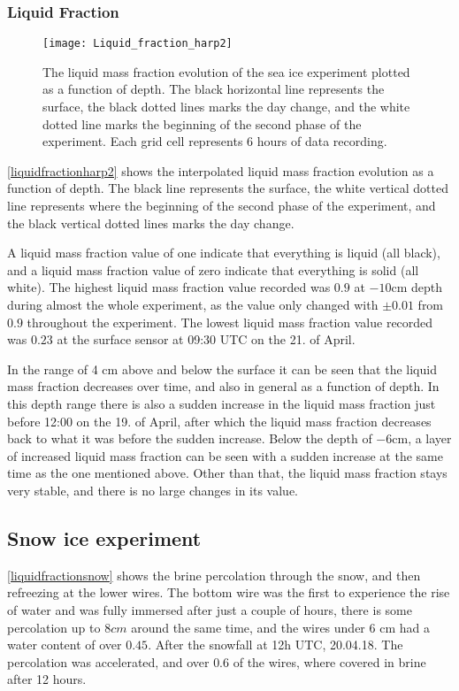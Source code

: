 \subsubsection{Liquid Fraction}
\begin{figure}[h!]
	\centering
	\texttt{[image: Liquid\_fraction\_harp2]}
	\caption{The liquid mass fraction evolution of the sea ice experiment plotted as a function of depth. The black horizontal line represents the surface, the black dotted lines marks the day change, and the white dotted line marks the beginning of the second phase of the experiment. Each grid cell represents 6 hours of data recording.}
	\label{liquidfractionharp2}
\end{figure}

\autoref{liquidfractionharp2} shows the interpolated liquid mass fraction evolution as a function of depth. The black line represents the surface, the white vertical dotted line represents where the beginning of the second phase of the experiment, and the black vertical dotted lines marks the day change. 

A liquid mass fraction value of one indicate that everything is liquid (all black), and a liquid mass fraction value of zero indicate that everything is solid (all white). The highest liquid mass fraction value recorded was $0.9$ at $-10$cm depth during almost the whole experiment, as the value only changed with $\pm 0.01$ from $0.9$ throughout the experiment. The lowest liquid mass fraction value recorded was $0.23$ at the surface sensor at 09:30 UTC on the 21. of April. 

In the range of 4 cm above and below the surface it can be seen that the liquid mass fraction decreases over time, and also in general as a function of depth. In this depth range there is also a sudden increase in the liquid mass fraction just before 12:00 on the 19. of April, after which the liquid mass fraction decreases back to what it was before the sudden increase. Below the depth of $-6$cm, a layer of increased liquid mass fraction can be seen with a sudden increase at the same time as the one mentioned above. Other than that, the liquid mass fraction stays very stable, and there is no large changes in its value. 


\subsection{Snow ice experiment}


\autoref{liquidfractionsnow} shows the brine percolation through the snow, and then refreezing at the lower wires. The bottom wire was the first to experience the rise of water and was fully immersed after just a couple of hours, there is some percolation up to $8 cm$ around the same time, and the wires under 6 cm had a water content of over $0.45$. After the snowfall at 12h UTC, 20.04.18. The percolation was accelerated, and over $0.6$ of the wires, where covered in brine after 12 hours.

